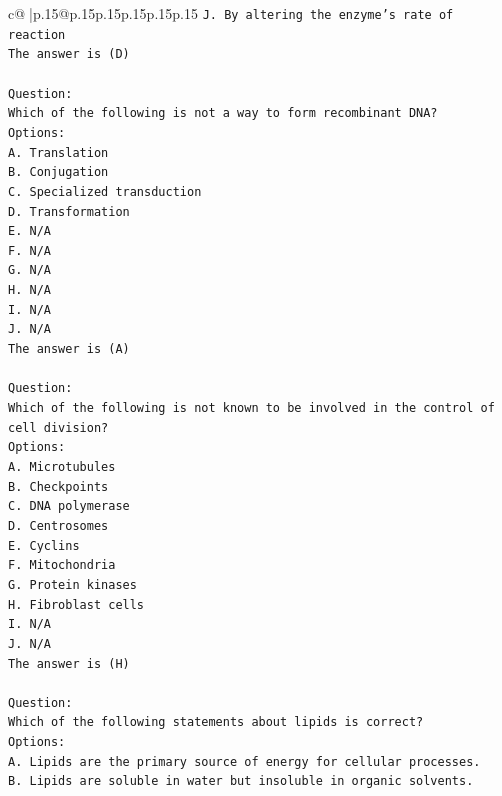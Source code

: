 \documentclass{article}
\begin{document}
{\begin{supertabular}{c@{$\;$}|p{.15\linewidth}@{}p{.15\linewidth}p{.15\linewidth}p{.15\linewidth}p{.15\linewidth}p{.15\linewidth}}
{{{\texttt{J. By altering the enzyme's rate of reaction} \\
\texttt{The answer is (D)} \\
\\ 
\texttt{Question:} \\
\texttt{Which of the following is not a way to form recombinant DNA?} \\
\texttt{Options:} \\
\texttt{A. Translation} \\
\texttt{B. Conjugation} \\
\texttt{C. Specialized transduction} \\
\texttt{D. Transformation} \\
\texttt{E. N/A} \\
\texttt{F. N/A} \\
\texttt{G. N/A} \\
\texttt{H. N/A} \\
\texttt{I. N/A} \\
\texttt{J. N/A} \\
\texttt{The answer is (A)} \\
\\ 
\texttt{Question:} \\
\texttt{Which of the following is not known to be involved in the control of cell division?} \\
\texttt{Options:} \\
\texttt{A. Microtubules} \\
\texttt{B. Checkpoints} \\
\texttt{C. DNA polymerase} \\
\texttt{D. Centrosomes} \\
\texttt{E. Cyclins} \\
\texttt{F. Mitochondria} \\
\texttt{G. Protein kinases} \\
\texttt{H. Fibroblast cells} \\
\texttt{I. N/A} \\
\texttt{J. N/A} \\
\texttt{The answer is (H)} \\
\\ 
\texttt{Question:} \\
\texttt{Which of the following statements about lipids is correct?} \\
\texttt{Options:} \\
\texttt{A. Lipids are the primary source of energy for cellular processes.} \\
\texttt{B. Lipids are soluble in water but insoluble in organic solvents.} \\
}}}
\end{supertabular}}
\end{document}
